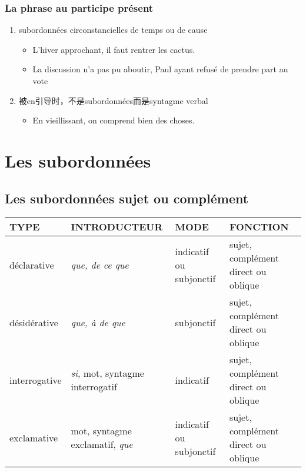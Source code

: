 \documentclass[UTF8]{report}
\begin{document}
\subsubsection{La phrase au participe présent}
\begin{enumerate}
    \item subordonnées circonstancielles de temps ou de cause
    \begin{itemize}
        \item L’hiver approchant, il faut rentrer les cactus.
        \item La discussion n’a pas pu aboutir, Paul ayant refusé de prendre part au vote
    \end{itemize}
    \item 被en引导时，不是subordonnées而是syntagme verbal
    \begin{itemize}
        \item En vieillissant, on comprend bien des choses.
    \end{itemize}
\end{enumerate}

\section{Les subordonnées}
\subsection{Les subordonnées sujet ou complément}

\begin{table}[H]
    \centering
    \begin{tabular}{|p{2.5cm}|p{3.5cm}|>{\RaggedRight}p{2.5cm}|p{4.5cm}|}
    \hline
    \rowcolor{cyan!20}
    \textbf{TYPE} & \textbf{INTRODUCTEUR} & \textbf{MODE} & \textbf{FONCTION} \\
    \hline
    déclarative & \textit{que, de ce que} & indicatif ou subjonctif & sujet, complément direct ou oblique \\
    \hline
    désidérative & \textit{que, à de que} & subjonctif & sujet, complément direct ou oblique \\
    \hline
    interrogative & \textit{si}, mot, syntagme interrogatif & indicatif &  sujet, complément direct ou oblique \\
    \hline
    exclamative & mot, syntagme exclamatif, \textit{que} & indicatif ou subjonctif &  sujet, complément direct ou oblique \\
    \hline
    \end{tabular}
\end{table}
\end{document}
